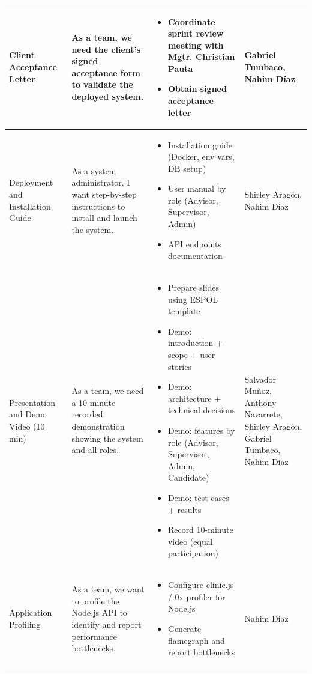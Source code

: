 \documentclass[letterpaper%
, oneside%
, 12pt%
, memoireprojet%
, english%
,creativecommons,hyperref, withAlgo2e %
]{thETS}
\begin{document}
\begin{longtable}{|p{3.2cm}|p{4.4cm}|p{5.4cm}|p{3.0cm}|}
Client Acceptance Letter & As a team, we need the client's signed acceptance form to validate the deployed system. & \begin{itemize}\setlength{\itemsep}{2pt}
    \item Coordinate sprint review meeting with Mgtr. Christian Pauta
    \item Obtain signed acceptance letter
\end{itemize} & Gabriel Tumbaco, Nahim Díaz \\ \hline

Deployment and Installation Guide & As a system administrator, I want step-by-step instructions to install and launch the system. & \begin{itemize}\setlength{\itemsep}{2pt}
    \item Installation guide (Docker, env vars, DB setup)
    \item User manual by role (Advisor, Supervisor, Admin)
    \item API endpoints documentation
\end{itemize} & Shirley Aragón, Nahim Díaz \\ \hline

Presentation and Demo Video (10 min) & As a team, we need a 10-minute recorded demonstration showing the system and all roles. & \begin{itemize}\setlength{\itemsep}{2pt}
    \item Prepare slides using ESPOL template
    \item Demo: introduction + scope + user stories
    \item Demo: architecture + technical decisions
    \item Demo: features by role (Advisor, Supervisor, Admin, Candidate)
    \item Demo: test cases + results
    \item Record 10-minute video (equal participation)
\end{itemize} & Salvador Muñoz, Anthony Navarrete, Shirley Aragón, Gabriel Tumbaco, Nahim Díaz \\ \hline

Application Profiling & As a team, we want to profile the Node.js API to identify and report performance bottlenecks. & \begin{itemize}\setlength{\itemsep}{2pt}
    \item Configure clinic.js / 0x profiler for Node.js
    \item Generate flamegraph and report bottlenecks
\end{itemize} & Nahim Díaz \\ \hline


\end{longtable}
\end{document}

